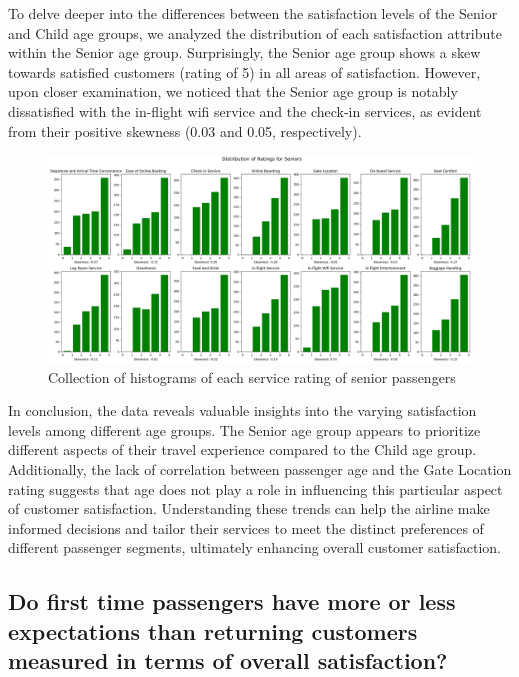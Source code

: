 \documentclass[11pt]{article}
\begin{document}
To delve deeper into the differences between the satisfaction levels of the Senior and Child age groups, we analyzed the distribution of each satisfaction attribute within the Senior age group. Surprisingly, the Senior age group shows a skew towards satisfied customers (rating of 5) in all areas of satisfaction. However, upon closer examination, we noticed that the Senior age group is notably dissatisfied with the in-flight wifi service and the check-in services, as evident from their positive skewness (\num{0.03} and \num{0.05}, respectively).

\begin{figure}[h]
\centering
\includegraphics[width=0.9\linewidth]{project_files/project_59_0.png}
\caption{\centering Collection of histograms of each service rating of senior passengers}
\end{figure}

In conclusion, the data reveals valuable insights into the varying satisfaction levels among different age groups. The Senior age group appears to prioritize different aspects of their travel experience compared to the Child age group. Additionally, the lack of correlation between passenger age and the Gate Location rating suggests that age does not play a role in influencing this particular aspect of customer satisfaction. Understanding these trends can help the airline make informed decisions and tailor their services to meet the distinct preferences of different passenger segments, ultimately enhancing overall customer satisfaction.


        
    \hypertarget{question-7.3}{%
\subsection{Do first time passengers have more or less expectations
than returning customers measured in terms of overall
satisfaction?}\label{question-7.3}}
\end{document}
